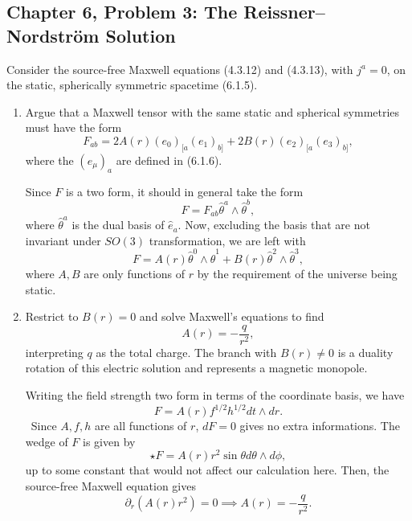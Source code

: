 \subsection{Chapter 6, Problem 3: The Reissner--Nordstr\"om Solution}

Consider the source-free Maxwell equations (4.3.12) and (4.3.13), with $j^a=0$,
on the static, spherically symmetric spacetime (6.1.5).

\begin{enumerate}[label=\alph*)]
    \item Argue that a Maxwell tensor with the same static and spherical
    symmetries must have the form
    \begin{equation}
        F_{ab}
        =2A(r)(e_0)_{[a}(e_1)_{b]}
        +2B(r)(e_2)_{[a}(e_3)_{b]},
    \end{equation}
    where the $(e_\mu)_a$ are defined in (6.1.6).
    \begin{solution}
        Since $F$ is a two form, it should in general take the form
        \begin{equation}
            F = F_{ab} \hat \theta^a \wedge \hat \theta^b,
        \end{equation}
        where $\hat \theta^a$ is the dual basis of $\hat e_a$. Now, excluding the basis that are not invariant under $SO(3)$ transformation, we are left with
        \begin{equation}
            F = A(r) \hat \theta^0 \wedge \hat \theta^1 + B(r) \hat{\theta}^2 \wedge\hat \theta^3,
        \end{equation}
        where $A, B$ are only functions of $r$ by the requirement of the universe being static.
    \end{solution}

    \item Restrict to $B(r)=0$ and solve Maxwell's equations to find
    \begin{equation}
        A(r)=-\frac{q}{r^2},
    \end{equation}
    interpreting $q$ as the total charge. The branch with $B(r)\neq0$ is a
    duality rotation of this electric solution and represents a magnetic monopole.
    \begin{solution}
        Writing the field strength two form in terms of the coordinate basis, we have
        \begin{equation}
            F = A(r) f^{1/2}h^{1/2}dt\wedge dr.
        \end{equation}\
        Since $A, f ,h$ are all functions of $r$, $dF = 0$ gives no extra informations. The wedge of $F$ is given by
        \begin{equation}
            \star F = A(r)r^2\sin\theta d\theta \wedge d\phi,
        \end{equation}
        up to some constant that would not affect our calculation here.
        Then, the source-free Maxwell equation gives
        \begin{equation}
            \partial_r(A(r)r^2) = 0 \implies A(r) = -\frac{q}{r^2}.
        \end{equation}


\end{solution}
\end{enumerate}
